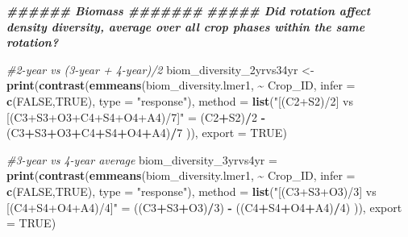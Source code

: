 \documentclass[
]{article}
\newenvironment{Shaded}{\begin{snugshade}}{\end{snugshade}}
\newcommand{\AttributeTok}[1]{\textcolor[rgb]{0.13,0.29,0.53}{#1}}
\newcommand{\CommentTok}[1]{\textcolor[rgb]{0.56,0.35,0.01}{\textit{#1}}}
\newcommand{\ConstantTok}[1]{\textcolor[rgb]{0.56,0.35,0.01}{#1}}
\newcommand{\DecValTok}[1]{\textcolor[rgb]{0.00,0.00,0.81}{#1}}
\newcommand{\DocumentationTok}[1]{\textcolor[rgb]{0.56,0.35,0.01}{\textbf{\textit{#1}}}}
\newcommand{\FunctionTok}[1]{\textcolor[rgb]{0.13,0.29,0.53}{\textbf{#1}}}
\newcommand{\NormalTok}[1]{#1}
\newcommand{\OtherTok}[1]{\textcolor[rgb]{0.56,0.35,0.01}{#1}}
\newcommand{\SpecialCharTok}[1]{\textcolor[rgb]{0.81,0.36,0.00}{\textbf{#1}}}
\newcommand{\StringTok}[1]{\textcolor[rgb]{0.31,0.60,0.02}{#1}}
\begin{document}
\begin{Shaded}
\begin{Highlighting}[]
\DocumentationTok{\#\#\#\#\#\# Biomass \#\#\#\#\#\#\#}
\DocumentationTok{\#\#\#\#\# Did rotation affect density diversity, average over all crop phases within the same rotation?}

\CommentTok{\#2{-}year vs (3{-}year + 4{-}year)/2}
\NormalTok{biom\_diversity\_2yrvs34yr }\OtherTok{\textless{}{-}} \FunctionTok{print}\NormalTok{(}\FunctionTok{contrast}\NormalTok{(}\FunctionTok{emmeans}\NormalTok{(biom\_diversity.lmer1, }\SpecialCharTok{\textasciitilde{}}\NormalTok{ Crop\_ID,}
                                                   \AttributeTok{infer =} \FunctionTok{c}\NormalTok{(}\ConstantTok{FALSE}\NormalTok{,}\ConstantTok{TRUE}\NormalTok{), }
                                                   \AttributeTok{type =} \StringTok{"response"}\NormalTok{),}
                                           \AttributeTok{method =} \FunctionTok{list}\NormalTok{(}\StringTok{"[(C2+S2)/2] vs [(C3+S3+O3+C4+S4+O4+A4)/7]"} \OtherTok{=} 
\NormalTok{                                                           (C2}\SpecialCharTok{+}\NormalTok{S2)}\SpecialCharTok{/}\DecValTok{2} \SpecialCharTok{{-}}\NormalTok{ (C3}\SpecialCharTok{+}\NormalTok{S3}\SpecialCharTok{+}\NormalTok{O3}\SpecialCharTok{+}\NormalTok{C4}\SpecialCharTok{+}\NormalTok{S4}\SpecialCharTok{+}\NormalTok{O4}\SpecialCharTok{+}\NormalTok{A4)}\SpecialCharTok{/}\DecValTok{7}\NormalTok{ )),}
                                  \AttributeTok{export =} \ConstantTok{TRUE}\NormalTok{)}

\CommentTok{\#3{-}year vs 4{-}year average}
\NormalTok{biom\_diversity\_3yrvs4yr }\OtherTok{=} \FunctionTok{print}\NormalTok{(}\FunctionTok{contrast}\NormalTok{(}\FunctionTok{emmeans}\NormalTok{(biom\_diversity.lmer1, }\SpecialCharTok{\textasciitilde{}}\NormalTok{ Crop\_ID,}
                                                 \AttributeTok{infer =} \FunctionTok{c}\NormalTok{(}\ConstantTok{FALSE}\NormalTok{,}\ConstantTok{TRUE}\NormalTok{), }
                                                 \AttributeTok{type =} \StringTok{"response"}\NormalTok{), }
                                         \AttributeTok{method =} \FunctionTok{list}\NormalTok{(}\StringTok{"[(C3+S3+O3)/3] vs [(C4+S4+O4+A4)/4]"} \OtherTok{=} 
\NormalTok{                                                         ((C3}\SpecialCharTok{+}\NormalTok{S3}\SpecialCharTok{+}\NormalTok{O3)}\SpecialCharTok{/}\DecValTok{3}\NormalTok{) }\SpecialCharTok{{-}}\NormalTok{ ((C4}\SpecialCharTok{+}\NormalTok{S4}\SpecialCharTok{+}\NormalTok{O4}\SpecialCharTok{+}\NormalTok{A4)}\SpecialCharTok{/}\DecValTok{4}\NormalTok{) )),}
                                \AttributeTok{export =} \ConstantTok{TRUE}\NormalTok{)}


\end{Highlighting}
\end{Shaded}
\end{document}
